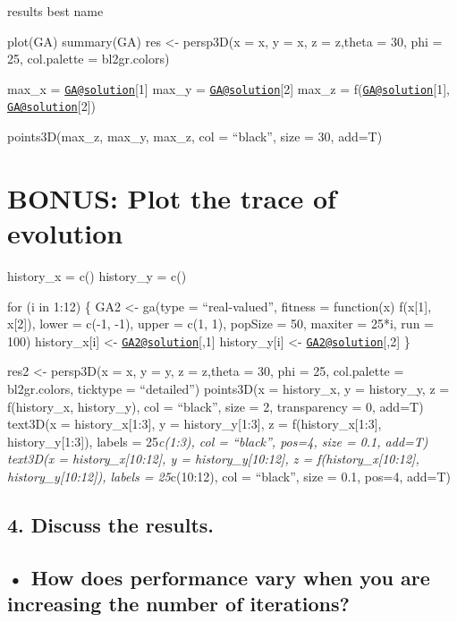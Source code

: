 \documentclass[]{article}
\begin{document}
results best name

plot(GA) summary(GA) res \textless{}- persp3D(x = x, y = x, z = z,theta
= 30, phi = 25, col.palette = bl2gr.colors)

max\_x = \href{mailto:GA@solution}{\nolinkurl{GA@solution}}{[}1{]}
max\_y = \href{mailto:GA@solution}{\nolinkurl{GA@solution}}{[}2{]}
max\_z = f(\href{mailto:GA@solution}{\nolinkurl{GA@solution}}{[}1{]},
\href{mailto:GA@solution}{\nolinkurl{GA@solution}}{[}2{]})

points3D(max\_z, max\_y, max\_z, col = ``black'', size = 30, add=T)

\hypertarget{bonus-plot-the-trace-of-evolution}{%
\section{BONUS: Plot the trace of
evolution}\label{bonus-plot-the-trace-of-evolution}}

history\_x = c() history\_y = c()

for (i in 1:12) \{ GA2 \textless{}- ga(type = ``real-valued'', fitness =
function(x) f(x{[}1{]}, x{[}2{]}), lower = c(-1, -1), upper = c(1, 1),
popSize = 50, maxiter = 25*i, run = 100) history\_x{[}i{]} \textless{}-
\href{mailto:GA2@solution}{\nolinkurl{GA2@solution}}{[},1{]}
history\_y{[}i{]} \textless{}-
\href{mailto:GA2@solution}{\nolinkurl{GA2@solution}}{[},2{]} \}

res2 \textless{}- persp3D(x = x, y = y, z = z,theta = 30, phi = 25,
col.palette = bl2gr.colors, ticktype = ``detailed'') points3D(x =
history\_x, y = history\_y, z = f(history\_x, history\_y), col =
``black'', size = 2, transparency = 0, add=T) text3D(x =
history\_x{[}1:3{]}, y = history\_y{[}1:3{]}, z = f(history\_x{[}1:3{]},
history\_y{[}1:3{]}), labels = 25\emph{c(1:3), col = ``black'', pos=4,
size = 0.1, add=T) text3D(x = history\_x{[}10:12{]}, y =
history\_y{[}10:12{]}, z = f(history\_x{[}10:12{]},
history\_y{[}10:12{]}), labels = 25}c(10:12), col = ``black'', size =
0.1, pos=4, add=T)

\hypertarget{discuss-the-results.}{%
\subsection{4. Discuss the results.}\label{discuss-the-results.}}

\hypertarget{how-does-performance-vary-when-you-are-increasing-the-number-of-iterations}{%
\subsection{• How does performance vary when you are increasing the
number of
iterations?}\label{how-does-performance-vary-when-you-are-increasing-the-number-of-iterations}}
\end{document}
